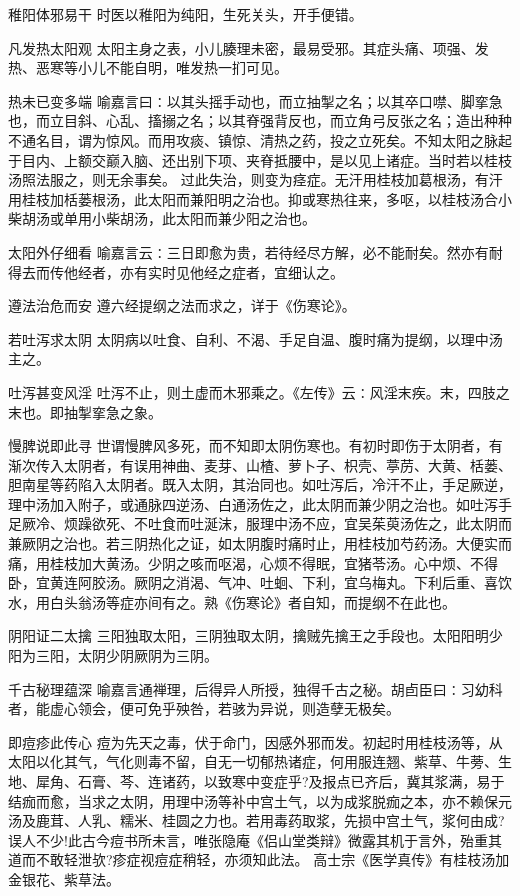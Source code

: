 \documentclass[a4paper,12pt,UTF8,twoside]{ctexbook}
\begin{document}
    稚阳体邪易干
    时医以稚阳为纯阳，生死关头，开手便错。
    
    凡发热太阳观
    太阳主身之表，小儿腠理未密，最易受邪。其症头痛、项强、发热、恶寒等小儿不能自明，唯发热一扪可见。
    
    热未已变多端
    喻嘉言曰∶以其头摇手动也，而立抽掣之名；以其卒口噤、脚挛急也，而立目斜、心乱、搐搦之名；以其脊强背反也，而立角弓反张之名；造出种种不通名目，谓为惊风。而用攻痰、镇惊、清热之药，投之立死矣。不知太阳之脉起于目内、上额交巅入脑、还出别下项、夹脊抵腰中，是以见上诸症。当时若以桂枝汤照法服之，则无余事矣。
    过此失治，则变为痉症。无汗用桂枝加葛根汤，有汗用桂枝加栝蒌根汤，此太阳而兼阳明之治也。抑或寒热往来，多呕，以桂枝汤合小柴胡汤或单用小柴胡汤，此太阳而兼少阳之治也。
    
    太阳外仔细看
    喻嘉言云∶三日即愈为贵，若待经尽方解，必不能耐矣。然亦有耐得去而传他经者，亦有实时见他经之症者，宜细认之。
    
    遵法治危而安
    遵六经提纲之法而求之，详于《伤寒论》。
    
    若吐泻求太阴
    太阴病以吐食、自利、不渴、手足自温、腹时痛为提纲，以理中汤主之。
    
    吐泻甚变风淫
    吐泻不止，则土虚而木邪乘之。《左传》云∶风淫末疾。末，四肢之末也。即抽掣挛急之象。
    
    慢脾说即此寻
    世谓慢脾风多死，而不知即太阴伤寒也。有初时即伤于太阴者，有渐次传入太阴者，有误用神曲、麦芽、山楂、萝卜子、枳壳、葶苈、大黄、栝蒌、胆南星等药陷入太阴者。既入太阴，其治同也。如吐泻后，冷汗不止，手足厥逆，理中汤加入附子，或通脉四逆汤、白通汤佐之，此太阴而兼少阴之治也。如吐泻手足厥冷、烦躁欲死、不吐食而吐涎沫，服理中汤不应，宜吴茱萸汤佐之，此太阴而兼厥阴之治也。若三阴热化之证，如太阴腹时痛时止，用桂枝加芍药汤。大便实而痛，用桂枝加大黄汤。少阴之咳而呕渴，心烦不得眠，宜猪苓汤。心中烦、不得卧，宜黄连阿胶汤。厥阴之消渴、气冲、吐蛔、下利，宜乌梅丸。下利后重、喜饮水，用白头翁汤等症亦间有之。熟《伤寒论》者自知，而提纲不在此也。
    
    阴阳证二太擒
    三阳独取太阳，三阴独取太阴，擒贼先擒王之手段也。太阳阳明少阳为三阳，太阴少阴厥阴为三阴。
    
    千古秘理蕴深
    喻嘉言通禅理，后得异人所授，独得千古之秘。胡卣臣曰∶习幼科者，能虚心领会，便可免乎殃咎，若骇为异说，则造孽无极矣。
    
    即痘疹此传心
    痘为先天之毒，伏于命门，因感外邪而发。初起时用桂枝汤等，从太阳以化其气，气化则毒不留，自无一切郁热诸症，何用服连翘、紫草、牛蒡、生地、犀角、石膏、芩、连诸药，以致寒中变症乎?及报点已齐后，冀其浆满，易于结痂而愈，当求之太阴，用理中汤等补中宫土气，以为成浆脱痂之本，亦不赖保元汤及鹿茸、人乳、糯米、桂圆之力也。若用毒药取浆，先损中宫土气，浆何由成?误人不少!此古今痘书所未言，唯张隐庵《侣山堂类辩》微露其机于言外，殆重其道而不敢轻泄欤?疹症视痘症稍轻，亦须知此法。
    高士宗《医学真传》有桂枝汤加金银花、紫草法。
    
\end{document}
